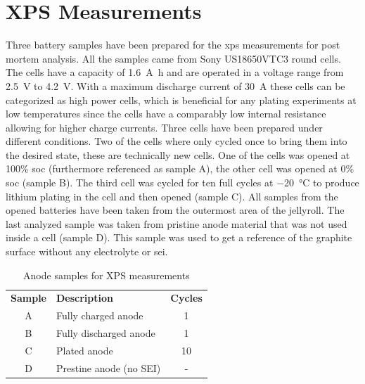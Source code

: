 \section{XPS Measurements}
Three battery samples have been prepared for the \gls{xps} measurements for post mortem analysis. All the samples came from Sony US18650VTC3 round cells. The cells have a capacity of \SI{1.6}{\ampere\hour} and are operated in a voltage range from \SI{2.5}{\volt} to \SI{4.2}{\volt}. With a maximum discharge current of \SI{30}{\ampere} these cells can be categorized as high power cells, which is beneficial for any plating experiments at low temperatures since the cells have a comparably low internal resistance allowing for higher charge currents. Three cells have been prepared under different conditions. Two of the cells where only cycled once to bring them into the desired state, these are technically new cells. One of the cells was opened at 100\% \gls{soc} (furthermore referenced as sample A), the other cell was opened at 0\% \gls{soc} (sample B). The third cell was cycled for ten full cycles at \SI{-20}{\celsius} to produce lithium plating in the cell and then opened (sample C). All samples from the opened batteries have been taken from the outermost area of the jellyroll. The last analyzed sample was taken from pristine anode material that was not used inside a cell (sample D). This sample was used to get a reference of the graphite surface without any electrolyte or \gls{sei}. \par 

\begin{table}[h]
\centering
\begin{tabular}{clc}
\multicolumn{1}{l}{\textbf{Sample}} & \textbf{Description}    & \multicolumn{1}{l}{\textbf{Cycles}} \\
A                                   & Fully charged anode  & 1                                   \\
B                                   & Fully discharged anode     & 1                                   \\
C                                   & Plated anode            & 10                                  \\
D                                   & Prestine anode (no SEI) & -                                  
\end{tabular}
\caption{Anode samples for XPS measurements}
\label{xpsamples}
\end{table}

